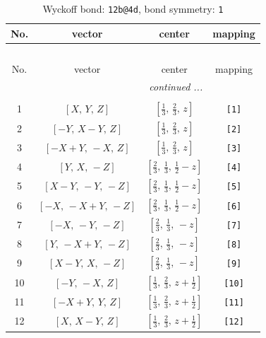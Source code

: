 \documentclass[fleqn,8pt]{jsarticle}
\begin{document}
\begin{longtable}{cccc}
\caption{Wyckoff bond: {\tt 12b@4d}, bond symmetry: {\tt 1}}
 \\
 \hline \hline
No. & vector & center & mapping \\ \hline \endfirsthead

\multicolumn{3}{l}{\tablename\ \thetable{}} \\
 \hline \hline
No. & vector & center & mapping \\ \hline \endhead

 \hline \hline
\multicolumn{3}{r}{\footnotesize\it continued ...} \\ \endfoot

 \hline \hline
\multicolumn{3}{r}{} \\ \endlastfoot

1 & $\left[ X,\, Y,\, Z \right]$ & $\left[ \frac{1}{3},\, \frac{2}{3},\, z \right]$ & {\tt [1]} \\ \hline
2 & $\left[ - Y,\, X - Y,\, Z \right]$ & $\left[ \frac{1}{3},\, \frac{2}{3},\, z \right]$ & {\tt [2]} \\ \hline
3 & $\left[ - X + Y,\, - X,\, Z \right]$ & $\left[ \frac{1}{3},\, \frac{2}{3},\, z \right]$ & {\tt [3]} \\ \hline
4 & $\left[ Y,\, X,\, - Z \right]$ & $\left[ \frac{2}{3},\, \frac{1}{3},\, \frac{1}{2} - z \right]$ & {\tt [4]} \\ \hline
5 & $\left[ X - Y,\, - Y,\, - Z \right]$ & $\left[ \frac{2}{3},\, \frac{1}{3},\, \frac{1}{2} - z \right]$ & {\tt [5]} \\ \hline
6 & $\left[ - X,\, - X + Y,\, - Z \right]$ & $\left[ \frac{2}{3},\, \frac{1}{3},\, \frac{1}{2} - z \right]$ & {\tt [6]} \\ \hline
7 & $\left[ - X,\, - Y,\, - Z \right]$ & $\left[ \frac{2}{3},\, \frac{1}{3},\, - z \right]$ & {\tt [7]} \\ \hline
8 & $\left[ Y,\, - X + Y,\, - Z \right]$ & $\left[ \frac{2}{3},\, \frac{1}{3},\, - z \right]$ & {\tt [8]} \\ \hline
9 & $\left[ X - Y,\, X,\, - Z \right]$ & $\left[ \frac{2}{3},\, \frac{1}{3},\, - z \right]$ & {\tt [9]} \\ \hline
10 & $\left[ - Y,\, - X,\, Z \right]$ & $\left[ \frac{1}{3},\, \frac{2}{3},\, z + \frac{1}{2} \right]$ & {\tt [10]} \\ \hline
11 & $\left[ - X + Y,\, Y,\, Z \right]$ & $\left[ \frac{1}{3},\, \frac{2}{3},\, z + \frac{1}{2} \right]$ & {\tt [11]} \\ \hline
12 & $\left[ X,\, X - Y,\, Z \right]$ & $\left[ \frac{1}{3},\, \frac{2}{3},\, z + \frac{1}{2} \right]$ & {\tt [12]} \\
\end{longtable}
\end{document}
